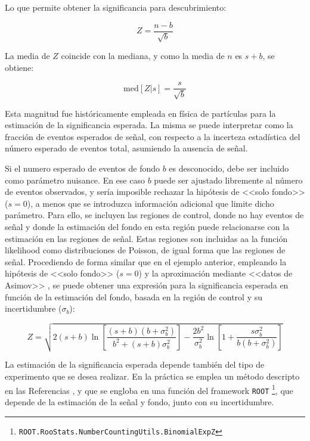 Lo que permite obtener la significancia para descubrimiento:

\begin{equation}
	Z = \frac{n-b}{\sqrt{b}}
\end{equation}

La media de $Z$ coincide con la mediana, y como la media de $n$ es $s+b$, se obtiene:

\begin{equation}
	\text{med}[Z|s] = \frac{s}{\sqrt{b}}
\end{equation}

Esta magnitud fue históricamente empleada en física de partículas para la estimación de la significancia esperada. La misma se puede interpretar como la fracción de eventos esperados de señal, con respecto a la incerteza estadística del número esperado de eventos total, asumiendo la ausencia de señal.

Si el numero esperado de eventos de fondo $b$ es desconocido, debe ser incluido como parámetro nuisance. En ese caso $b$ puede ser ajustado libremente al número de eventos observados, y sería imposible rechazar la hipótesis de <<solo fondo>> ($s=0$), a menos que se introduzca información adicional que limite dicho parámetro. Para ello, se incluyen las regiones de control, donde no hay eventos de señal y donde la estimación del fondo en esta región puede relacionarse con la estimación en las regiones de señal. Estas regiones son incluidas aa la función likelihood como distribuciones de Poisson, de igual forma que las regiones de señal. Procediendo de forma similar que en el ejemplo anterior, empleando la hipótesis de <<solo fondo>> ($s=0$) y la aproximación mediante <<datos de Asimov>> \cite{Cowan:2010js}, se puede obtener una expresión para la significancia esperada en función de la estimación del fondo, basada en la región de control y su incertidumbre ($\sigma_b$):

\begin{equation}
	Z = \sqrt{ 2 (s+b) \ln{\left[ \frac{(s+b)(b+\sigma_b^2)}{b^2 + (s+b)\sigma_b^2} \right]} - \frac{2 b^2}{\sigma_b^2} \ln{ \left[ 1 + \frac{s \sigma_b^2}{b(b+\sigma_b^2)} \right] } }
\end{equation}

La estimación de la significancia esperada depende también del tipo de experimento que se desea realizar. En la práctica se emplea un método descripto en las Referencias \cite{Linnemann:2003vw, stat_1, ATL-PHYS-PUB-2020-025}, y que se engloba en una función del framework \texttt{ROOT} \footnote{\texttt{ROOT.RooStats.NumberCountingUtils.BinomialExpZ}}, que depende de la estimación de la señal y fondo, junto con su incertidumbre. 

